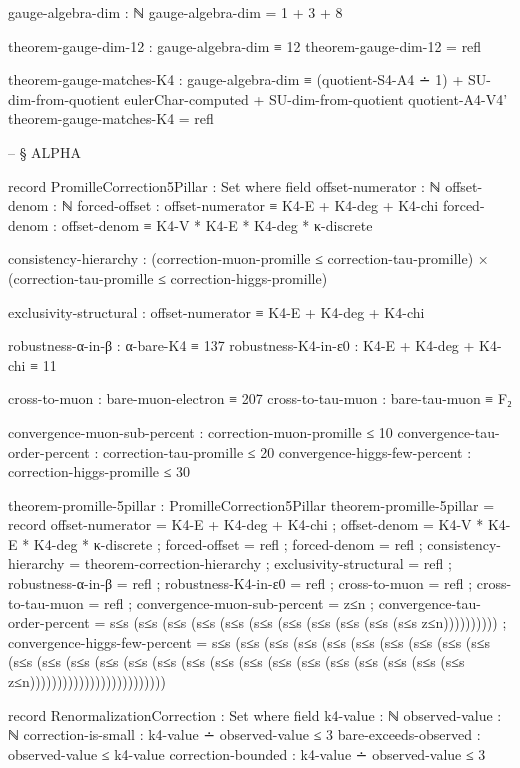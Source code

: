 \documentclass[11pt,a4paper]{book}
\begin{document}
\begin{code}
gauge-algebra-dim : ℕ
gauge-algebra-dim = 1 + 3 + 8

theorem-gauge-dim-12 : gauge-algebra-dim ≡ 12
theorem-gauge-dim-12 = refl

theorem-gauge-matches-K4 :
  gauge-algebra-dim ≡ (quotient-S4-A4 ∸ 1)
                    + SU-dim-from-quotient eulerChar-computed
                    + SU-dim-from-quotient quotient-A4-V4'
theorem-gauge-matches-K4 = refl


-- § ALPHA

record PromilleCorrection5Pillar : Set where
  field
    offset-numerator : ℕ
    offset-denom : ℕ
    forced-offset : offset-numerator ≡ K4-E + K4-deg + K4-chi
    forced-denom : offset-denom ≡ K4-V * K4-E * K4-deg * κ-discrete
    
    consistency-hierarchy : (correction-muon-promille ≤ correction-tau-promille) × 
                            (correction-tau-promille ≤ correction-higgs-promille)
    
    exclusivity-structural : offset-numerator ≡ K4-E + K4-deg + K4-chi
    
    robustness-α-in-β : α-bare-K4 ≡ 137
    robustness-K4-in-ε0 : K4-E + K4-deg + K4-chi ≡ 11
    
    cross-to-muon : bare-muon-electron ≡ 207
    cross-to-tau-muon : bare-tau-muon ≡ F₂
    
    convergence-muon-sub-percent : correction-muon-promille ≤ 10
    convergence-tau-order-percent : correction-tau-promille ≤ 20
    convergence-higgs-few-percent : correction-higgs-promille ≤ 30

theorem-promille-5pillar : PromilleCorrection5Pillar
theorem-promille-5pillar = record
  { offset-numerator = K4-E + K4-deg + K4-chi
  ; offset-denom = K4-V * K4-E * K4-deg * κ-discrete
  ; forced-offset = refl
  ; forced-denom = refl
  ; consistency-hierarchy = theorem-correction-hierarchy
  ; exclusivity-structural = refl
  ; robustness-α-in-β = refl
  ; robustness-K4-in-ε0 = refl
  ; cross-to-muon = refl
  ; cross-to-tau-muon = refl
  ; convergence-muon-sub-percent = z≤n
  ; convergence-tau-order-percent = s≤s (s≤s (s≤s (s≤s (s≤s (s≤s (s≤s (s≤s (s≤s (s≤s (s≤s z≤n))))))))))
  ; convergence-higgs-few-percent = s≤s (s≤s (s≤s (s≤s (s≤s (s≤s (s≤s (s≤s (s≤s (s≤s (s≤s (s≤s (s≤s (s≤s (s≤s (s≤s (s≤s (s≤s (s≤s (s≤s (s≤s (s≤s (s≤s (s≤s (s≤s (s≤s z≤n)))))))))))))))))))))))))
  }

record RenormalizationCorrection : Set where
  field
    k4-value : ℕ
    observed-value : ℕ
    correction-is-small : k4-value ∸ observed-value ≤ 3
    bare-exceeds-observed : observed-value ≤ k4-value
    correction-bounded : k4-value ∸ observed-value ≤ 3


\end{code}
\end{document}

